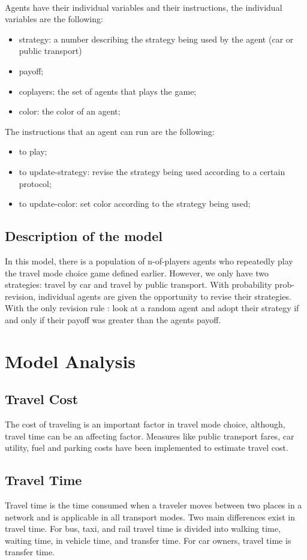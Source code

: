 \paragraph{}
Agents have their individual variables and their instructions, the individual variables are the following:
\begin{itemize}
\item strategy: a number describing the strategy being used by the agent (car or public transport)
\item payoff;
\item coplayers: the set of agents that plays the game;
\item color: the color of an agent;
\end{itemize}
The instructions that an agent can run are the following: 
\begin{itemize}
\item to play;
\item to update-strategy: revise the strategy being used according to a certain protocol;
\item to update-color: set color according to the strategy being used;
\end{itemize}
\subsection{Description of the model}
In this model, there is a population of n-of-players agents who repeatedly play the travel mode choice game defined earlier. However, we only have two strategies: travel by car and travel by public transport. 
With probability prob-revision, individual agents are given the opportunity to revise their strategies. With the only revision rule : look at a random agent and adopt their strategy if and only if their payoff was greater than the agents payoff.
\section{Model Analysis}
\subsection{Travel Cost}
The cost of traveling is an important factor in travel mode choice, although, travel time can be an affecting factor. Measures like public transport fares, car utility, fuel and parking costs have been implemented to estimate travel cost.
\subsection{Travel Time}
Travel time is the time consumed when a traveler moves between two places in a network and is applicable in all transport modes. Two main differences exist in travel time. 
For bus, taxi, and rail travel time is divided into walking time, waiting time, in vehicle time, and transfer time. For car owners, travel time is transfer time. 
